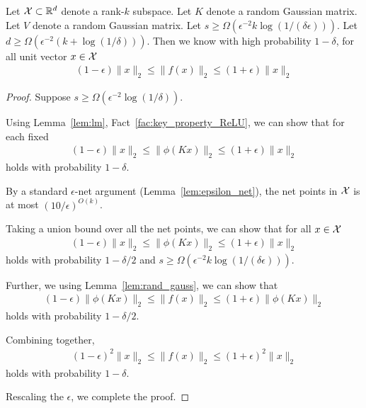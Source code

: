 \begin{lemma}
Let ${\cal X} \subset \mathbb{R}^d$ denote a rank-$k$ subspace. %
Let $K$ denote a random Gaussian matrix. Let $V$ denote a random Gaussian matrix. Let $s \geq \Omega( \epsilon^{-2}  k\log(1/ (\delta \epsilon ) ) )$. Let $d \geq \Omega(\epsilon^{-2} (k + \log(1/\delta)))$. Then we know with high probability $1-\delta$, for all unit vector $x \in {\cal X}$
\begin{align*}
(1-\epsilon) \| x \|_2 \leq \| f(x) \|_2 \leq (1+\epsilon) \| x \|_2
\end{align*}
\end{lemma}
\begin{proof}
Suppose $s \geq \Omega( \epsilon^{-2} \log(1/\delta ) )$.


Using Lemma~\ref{lem:lm}, Fact~\ref{fac:key_property_ReLU}, we can show that for each fixed 
\begin{align*}
(1-\epsilon) \| x \|_2 \leq \| \phi(K x ) \|_2 \leq (1+\epsilon) \| x \|_2
\end{align*}
holds with probability $1-\delta$.

By a standard $\epsilon$-net argument (Lemma~\ref{lem:epsilon_net}), the net points in ${\cal X}$ is at most $(10/\epsilon)^{O(k)}$.


Taking a union bound over all the net points, we can show that for all $x \in {\cal X}$
\begin{align*}
(1-\epsilon) \| x \|_2 \leq \| \phi(K x ) \|_2 \leq (1+\epsilon)\| x \|_2
\end{align*}
holds with probability $1-\delta/2$ and $s \geq \Omega( \epsilon^{-2} k \log(1/ (\delta \epsilon) ) )$.

Further, we using Lemma~\ref{lem:rand_gauss}, we can show that
\begin{align*}
(1-\epsilon) \| \phi(K x) \|_2 \leq \| f(x) \|_2 \leq (1+\epsilon) \| \phi(K x) \|_2
\end{align*}
holds with probability $1-\delta/2$.

Combining together,
\begin{align*}
 (1-\epsilon)^2  \| x \|_2 \leq \| f(x) \|_2 \leq (1+\epsilon)^2 \| x \|_2 
\end{align*}
holds with probability $1-\delta$.

Rescaling the $\epsilon$, we complete the proof.

\end{proof}

